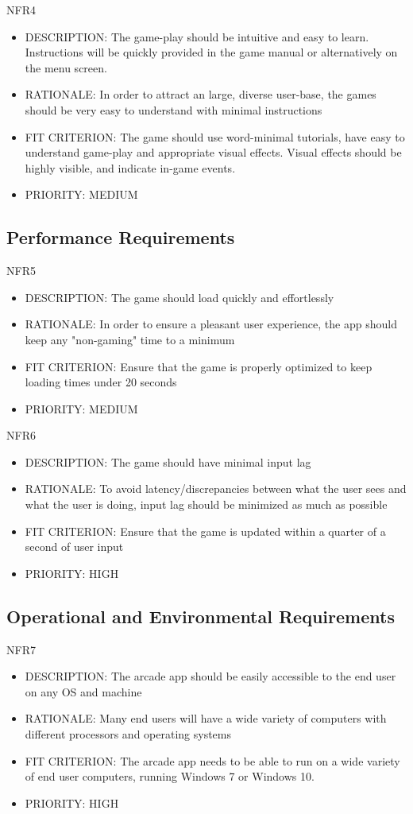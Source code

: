 \documentclass[12pt, titlepage]{article}
\begin{document}
NFR4
\begin{itemize}
    \item DESCRIPTION: The game-play should be intuitive and easy to learn. Instructions will be quickly provided in the game manual or alternatively on the menu screen.
    \item RATIONALE: In order to attract an large, diverse user-base, the games should be very easy to understand with minimal instructions
    \item FIT CRITERION: The game should use word-minimal tutorials, have easy to understand game-play and appropriate visual effects. Visual effects should be highly visible, and indicate in-game events. 
    \item PRIORITY: MEDIUM
\end{itemize}

\subsection{Performance Requirements}
NFR5
\begin{itemize}
    \item DESCRIPTION: The game should load quickly and effortlessly
    \item RATIONALE: In order to ensure a pleasant user experience, the app should keep any
"non-gaming" time to a minimum
    \item FIT CRITERION: Ensure that the game is properly optimized to keep loading times under 20 seconds
    \item PRIORITY: MEDIUM
\end{itemize}

NFR6
\begin{itemize}
    \item DESCRIPTION: The game should have minimal input lag
    \item RATIONALE: To avoid latency/discrepancies between what the user sees and what the user is doing,
input lag should be minimized as much as possible
    \item FIT CRITERION: Ensure that the game is updated within a quarter of a second of user input
    \item PRIORITY: HIGH
\end{itemize}

\subsection{Operational and Environmental Requirements}
NFR7
\begin{itemize}
    \item DESCRIPTION: The arcade app should be easily accessible to the end user on any OS and machine
    \item RATIONALE: Many end users will have a wide variety of computers with different processors and operating systems
    \item FIT CRITERION: The arcade app needs to be able to run on a wide variety of end user computers, running Windows 7 or Windows 10.
    \item PRIORITY: HIGH
\end{itemize}
\end{document}
